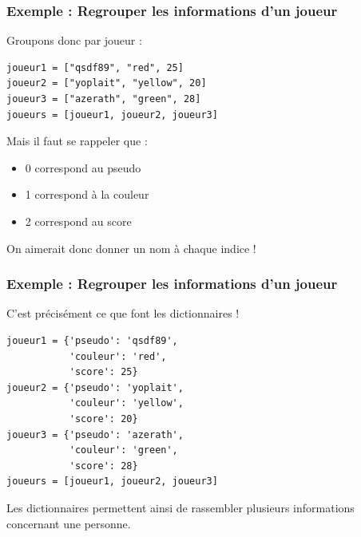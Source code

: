 \documentclass[x11names,svgnames]{beamer}
\begin{document}
\begin{frame}[fragile]
  \frametitle{Exemple : Regrouper les informations d'un joueur}

  Groupons donc par joueur :
  \begin{mdframed}[roundcorner=5pt]
\begin{verbatim}
joueur1 = ["qsdf89", "red", 25]
joueur2 = ["yoplait", "yellow", 20]
joueur3 = ["azerath", "green", 28]
joueurs = [joueur1, joueur2, joueur3]
\end{verbatim}
  \end{mdframed}
  \pause
  Mais il faut se rappeler que :
  \begin{itemize}
\item 0 correspond au pseudo
\item 1 correspond à la couleur
\item 2 correspond au score
  \end{itemize}

  On aimerait donc donner un nom à chaque indice !
\end{frame}


\begin{frame}[fragile]
  \frametitle{Exemple : Regrouper les informations d'un joueur}

C'est précisément ce que font les dictionnaires !

  \begin{mdframed}[roundcorner=5pt]
\begin{verbatim}
joueur1 = {'pseudo': 'qsdf89',
           'couleur': 'red',
           'score': 25}
joueur2 = {'pseudo': 'yoplait',
           'couleur': 'yellow',
           'score': 20}
joueur3 = {'pseudo': 'azerath',
           'couleur': 'green',
           'score': 28}
joueurs = [joueur1, joueur2, joueur3]
\end{verbatim}
  \end{mdframed}
  Les dictionnaires permettent ainsi de rassembler plusieurs informations concernant une personne.
\end{frame}
\end{document}
